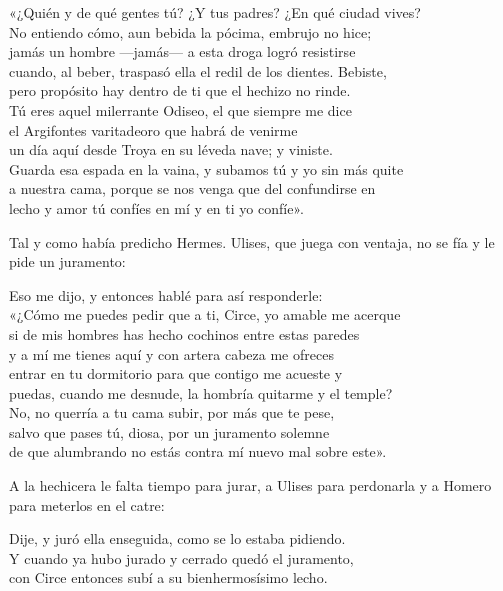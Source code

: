 \begin{versocita}
«¿Quién y de qué gentes tú? ¿Y tus padres? ¿En qué ciudad vives?\\
No entiendo cómo, aun bebida la pócima, embrujo no hice;\\
jamás un hombre ---jamás--- a esta droga logró resistirse\\
cuando, al beber, traspasó ella el redil de los dientes. Bebiste,\\
pero propósito hay dentro de ti que el hechizo no rinde.\\
Tú eres aquel milerrante Odiseo, el que siempre me dice\\
el Argifontes varitadeoro que habrá de venirme\\
un día aquí desde Troya en su léveda nave; y viniste.\\
Guarda esa espada en la vaina, y subamos tú y yo sin más quite\\
a nuestra cama, porque se nos venga que del confundirse en\\
lecho y amor tú confíes en mí y en ti yo confíe».
\end{versocita}

Tal y como había predicho Hermes. Ulises, que juega con ventaja, no se fía y le pide un juramento:

\begin{versocita}
Eso me dijo, y entonces hablé para así responderle:\\
«¿Cómo me puedes pedir que a ti, Circe, yo amable me acerque\\
si de mis hombres has hecho cochinos entre estas paredes\\
y a mí me tienes aquí y con artera cabeza me ofreces\\
entrar en tu dormitorio para que contigo me acueste y\\
puedas, cuando me desnude, la hombría quitarme y el temple?\\
No, no querría a tu cama subir, por más que te pese,\\
salvo que pases tú, diosa, por un juramento solemne\\
de que alumbrando no estás contra mí nuevo mal sobre este».
\end{versocita}

A la hechicera le falta tiempo para jurar, a Ulises para perdonarla y a Homero para meterlos en el catre:

\begin{versocita}
Dije, y juró ella enseguida, como se lo estaba pidiendo.\\
Y cuando ya hubo jurado y cerrado quedó el juramento,\\
con Circe entonces subí a su bienhermosísimo lecho.
\end{versocita}

